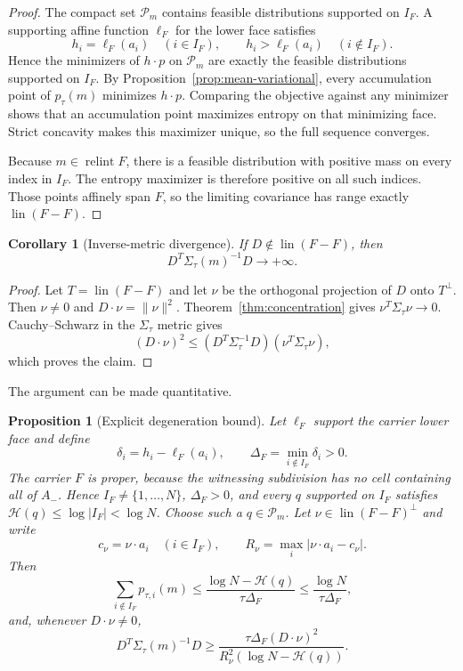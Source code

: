 \documentclass[11pt]{article}
\theoremstyle{plain}
\newtheorem{proposition}[theorem]{Proposition}
\newtheorem{corollary}[theorem]{Corollary}
\theoremstyle{definition}
\theoremstyle{remark}
\newcommand{\relint}{\operatorname{relint}}
\newcommand{\lin}{\operatorname{lin}}
\begin{document}
\begin{proof}
The compact set $\mathcal P_m$ contains feasible distributions supported on $I_F$. A supporting affine function $\ell_F$ for the lower face satisfies
\[
 h_i=\ell_F(a_i)\quad(i\in I_F),
 \qquad
 h_i>\ell_F(a_i)\quad(i\notin I_F).
\]
Hence the minimizers of $h\cdot p$ on $\mathcal P_m$ are exactly the feasible distributions supported on $I_F$. By Proposition~\ref{prop:mean-variational}, every accumulation point of $p_\tau(m)$ minimizes $h\cdot p$. Comparing the objective against any minimizer shows that an accumulation point maximizes entropy on that minimizing face. Strict concavity makes this maximizer unique, so the full sequence converges.

Because $m\in\relint F$, there is a feasible distribution with positive mass on every index in $I_F$. The entropy maximizer is therefore positive on all such indices. Those points affinely span $F$, so the limiting covariance has range exactly $\lin(F-F)$.
\end{proof}

\begin{corollary}[Inverse-metric divergence]\label{cor:inverse-divergence}
If $D\notin\lin(F-F)$, then
\[
 D^T\Sigma_\tau(m)^{-1}D\longrightarrow+\infty.
\]
\end{corollary}

\begin{proof}
Let $T=\lin(F-F)$ and let $\nu$ be the orthogonal projection of $D$ onto $T^\perp$. Then $\nu\ne0$ and $D\cdot\nu=\|\nu\|^2$. Theorem~\ref{thm:concentration} gives $\nu^T\Sigma_\tau\nu\to0$. Cauchy--Schwarz in the $\Sigma_\tau$ metric gives
\[
 (D\cdot\nu)^2
 \le
 (D^T\Sigma_\tau^{-1}D)(\nu^T\Sigma_\tau\nu),
\]
which proves the claim.
\end{proof}

The argument can be made quantitative.

\begin{proposition}[Explicit degeneration bound]\label{prop:quantitative}
Let $\ell_F$ support the carrier lower face and define
\[
 \delta_i=h_i-\ell_F(a_i),
 \qquad
 \Delta_F=\min_{i\notin I_F}\delta_i>0.
\]
The carrier $F$ is proper, because the witnessing subdivision has no cell containing all of $A_-$. Hence $I_F\ne\{1,\ldots,N\}$, $\Delta_F>0$, and every $q$ supported on $I_F$ satisfies $\mathcal H(q)\le\log|I_F|<\log N$. Choose such a $q\in\mathcal P_m$. Let $\nu\in\lin(F-F)^\perp$ and write
\[
 c_\nu=\nu\cdot a_i\quad(i\in I_F),
 \qquad
 R_\nu=\max_i|\nu\cdot a_i-c_\nu|.
\]
Then
\begin{equation}\label{eq:mass-bound}
 \sum_{i\notin I_F}p_{\tau,i}(m)
 \le
 \frac{\log N-\mathcal H(q)}{\tau\Delta_F}
 \le
 \frac{\log N}{\tau\Delta_F},
\end{equation}
and, whenever $D\cdot\nu\ne0$,
\begin{equation}\label{eq:inverse-bound}
 D^T\Sigma_\tau(m)^{-1}D
 \ge
 \frac{\tau\Delta_F(D\cdot\nu)^2}
 {R_\nu^2(\log N-\mathcal H(q))}.
\end{equation}
\end{proposition}
\end{document}
